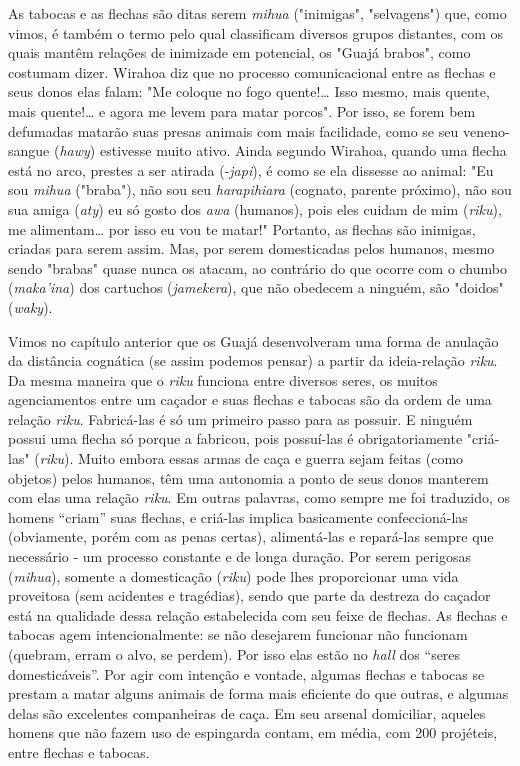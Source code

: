 As tabocas e as flechas são ditas serem \emph{mihua} ("inimigas",
"selvagens") que, como vimos, é também o termo pelo qual classificam
diversos grupos distantes, com os quais mantêm relações de inimizade em
potencial, os "Guajá brabos", como costumam dizer. Wirahoa diz que no
processo comunicacional entre as flechas e seus donos elas falam: "Me
coloque no fogo quente!\ldots{} Isso mesmo, mais quente, mais quente!\ldots{} e
agora me levem para matar porcos". Por isso, se forem bem defumadas
matarão suas presas animais com mais facilidade, como se seu
veneno-sangue (\emph{hawy}) estivesse muito ativo. Ainda segundo
Wirahoa, quando uma flecha está no arco, prestes a ser atirada
(-\emph{japi}), é como se ela dissesse ao animal: "Eu sou \emph{mihua}
("braba"), não sou seu \emph{harapihiara} (cognato, parente próximo),
não sou sua amiga (\emph{aty}) eu só gosto dos \emph{awa} (humanos),
pois eles cuidam de mim (\emph{riku}), me alimentam\ldots{} por isso eu vou
te matar!" Portanto, as flechas são inimigas, criadas para serem assim.
Mas, por serem domesticadas pelos humanos, mesmo sendo "brabas" quase
nunca os atacam, ao contrário do que ocorre com o chumbo
(\emph{maka'ina}) dos cartuchos (\emph{jamekera}), que não obedecem a
ninguém, são "doidos" (\emph{waky}).

Vimos no capítulo anterior que os Guajá desenvolveram uma forma de
anulação da distância cognática (se assim podemos pensar) a partir da
ideia-relação \emph{riku}. Da mesma maneira que o \emph{riku} funciona
entre diversos seres, os muitos agenciamentos entre um caçador e suas
flechas e tabocas são da ordem de uma relação \emph{riku}. Fabricá-las é
só um primeiro passo para as possuir. E ninguém possui uma flecha só
porque a fabricou, pois possuí-las é obrigatoriamente "criá-las"
(\emph{riku}). Muito embora essas armas de caça e guerra sejam feitas
(como objetos) pelos humanos, têm uma autonomia a ponto de seus donos
manterem com elas uma relação \emph{riku}. Em outras palavras, como
sempre me foi traduzido, os homens ``criam'' suas flechas, e criá-las
implica basicamente confeccioná-las (obviamente, porém com as penas
certas), alimentá-las e repará-las sempre que necessário - um processo
constante e de longa duração. Por serem perigosas (\emph{mihua}),
somente a domesticação (\emph{riku}) pode lhes proporcionar uma vida
proveitosa (sem acidentes e tragédias), sendo que parte da destreza do
caçador está na qualidade dessa relação estabelecida com seu feixe de
flechas. As flechas e tabocas agem intencionalmente: se não desejarem
funcionar não funcionam (quebram, erram o alvo, se perdem). Por isso
elas estão no \emph{hall} dos ``seres domesticáveis''. Por agir com
intenção e vontade, algumas flechas e tabocas se prestam a matar alguns
animais de forma mais eficiente do que outras, e algumas delas são
excelentes companheiras de caça. Em seu arsenal domiciliar, aqueles
homens que não fazem uso de espingarda contam, em média, com 200
projéteis, entre flechas e tabocas.

